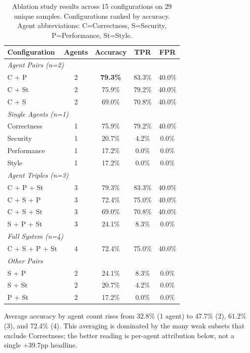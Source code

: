 \documentclass[10pt,twocolumn]{article}
\begin{document}
\begin{table}[t]
\centering
\caption{Ablation study results across 15 configurations on 29 unique samples. Configurations ranked by accuracy. Agent abbreviations: C=Correctness, S=Security, P=Performance, St=Style.}
\label{tab:ablation}
\small
\begin{tabular}{@{}lcccc@{}}
\toprule
\textbf{Configuration} & \textbf{Agents} & \textbf{Accuracy} & \textbf{TPR} & \textbf{FPR} \\
\midrule
\multicolumn{5}{l}{\textit{Agent Pairs (n=2)}} \\
C + P & 2 & \textbf{79.3\%} & 83.3\% & 40.0\% \\
C + St & 2 & 75.9\% & 79.2\% & 40.0\% \\
C + S & 2 & 69.0\% & 70.8\% & 40.0\% \\
\midrule
\multicolumn{5}{l}{\textit{Single Agents (n=1)}} \\
Correctness & 1 & 75.9\% & 79.2\% & 40.0\% \\
Security & 1 & 20.7\% & 4.2\% & 0.0\% \\
Performance & 1 & 17.2\% & 0.0\% & 0.0\% \\
Style & 1 & 17.2\% & 0.0\% & 0.0\% \\
\midrule
\multicolumn{5}{l}{\textit{Agent Triples (n=3)}} \\
C + P + St & 3 & 79.3\% & 83.3\% & 40.0\% \\
C + S + P & 3 & 72.4\% & 75.0\% & 40.0\% \\
C + S + St & 3 & 69.0\% & 70.8\% & 40.0\% \\
S + P + St & 3 & 24.1\% & 8.3\% & 0.0\% \\
\midrule
\multicolumn{5}{l}{\textit{Full System (n=4)}} \\
C + S + P + St & 4 & 72.4\% & 75.0\% & 40.0\% \\
\midrule
\multicolumn{5}{l}{\textit{Other Pairs}} \\
S + P & 2 & 24.1\% & 8.3\% & 0.0\% \\
S + St & 2 & 20.7\% & 4.2\% & 0.0\% \\
P + St & 2 & 17.2\% & 0.0\% & 0.0\% \\
\bottomrule
\end{tabular}
\end{table}

Average accuracy by agent count rises from 32.8\% (1 agent) to 47.7\% (2), 61.2\% (3), and 72.4\% (4). This averaging is dominated by the many weak subsets that exclude Correctness; the better reading is per-agent attribution below, not a single +39.7pp headline.
\end{document}
